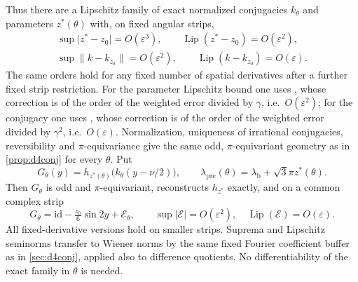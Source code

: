 \documentclass[11pt]{amsart}
\numberwithin{equation}{section}
\theoremstyle{definition}
\theoremstyle{remark}
\newcommand{\eps}{\varepsilon}
\newcommand{\abs}[1]{\lvert #1\rvert}
\newcommand{\norm}[1]{\lVert #1\rVert}
\newcommand{\Lip}{\operatorname{Lip}}
\newcommand{\id}{\mathrm{id}}
\newcommand{\lb}{\lambda_{\mathrm b}}
\begin{document}
Thus there are a Lipschitz family of exact normalized conjugacies $k_\theta$ and parameters $z^*(\theta)$ with, on fixed angular strips,
\begin{equation}\label{eq:d4fam}
\begin{gathered}
\sup\abs{z^*-z_0}=O(\eps^3),\qquad \Lip(z^*-z_0)=O(\eps^2),\\
\sup\norm{k-k_{z_0}}=O(\eps^2),\qquad\Lip(k-k_{z_0})=O(\eps).
\end{gathered}
\end{equation}
The same orders hold for any fixed number of spatial derivatives after a further fixed strip restriction. For the parameter Lipschitz bound one uses \cite[(4.40)]{FHL}, whose correction is of the order of the weighted error divided by $\gamma$, i.e.\ $O(\eps^2)$; for the conjugacy one uses \cite[(4.33), (4.35)]{FHL}, whose correction is of the order of the weighted error divided by $\gamma^2$, i.e.\ $O(\eps)$. Normalization, uniqueness of irrational conjugacies, reversibility and $\pi$-equivariance give the same odd, $\pi$-equivariant geometry as in \cref{prop:d4conj} for every $\theta$. Put
\[
G_\theta(y)=h_{z^*(\theta)}\bigl(k_\theta(y-\nu/2)\bigr),\qquad\lambda_{\mathrm{pre}}(\theta)=\lb+\sqrt3\pi z^*(\theta).
\]
Then $G_\theta$ is odd and $\pi$-equivariant, reconstructs $h_{z^*}$ exactly, and on a common complex strip
\begin{equation}\label{eq:Gfam}
G_\theta=\id-\tfrac{z_0}6\sin2y+\mathcal E_\theta,\qquad\sup\abs{\mathcal E}=O(\eps^2),\quad\Lip(\mathcal E)=O(\eps).
\end{equation}
All fixed-derivative versions hold on smaller strips. Suprema and Lipschitz seminorms transfer to Wiener norms by the same fixed Fourier coefficient buffer as in \cref{sec:d4conj}, applied also to difference quotients. No differentiability of the exact family in $\theta$ is needed.
\end{document}
